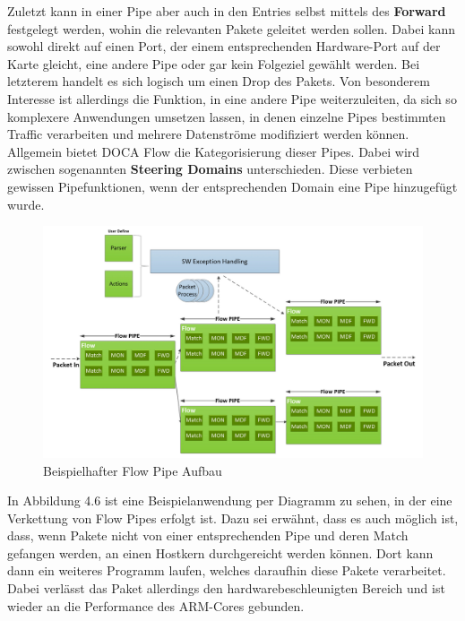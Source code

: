 Zuletzt kann in einer Pipe aber auch in den Entries selbst mittels des \textbf{Forward} festgelegt werden, wohin die relevanten Pakete geleitet werden sollen. Dabei kann sowohl direkt auf einen Port, der einem entsprechenden Hardware-Port auf der Karte gleicht, eine andere Pipe oder gar kein Folgeziel gewählt werden. Bei letzterem handelt es sich logisch um einen Drop des Pakets. Von besonderem Interesse ist allerdings die Funktion, in eine andere Pipe weiterzuleiten, da sich so komplexere Anwendungen umsetzen lassen, in denen einzelne Pipes bestimmten Traffic verarbeiten und mehrere Datenströme modifiziert werden können. Allgemein bietet DOCA Flow die Kategorisierung dieser Pipes. Dabei wird zwischen sogenannten \textbf{Steering Domains} unterschieden. Diese verbieten gewissen Pipefunktionen, wenn der entsprechenden Domain eine Pipe hinzugefügt wurde. 
\begin{figure}
    \centering
    \includegraphics[width=1\linewidth]{images/Screenshot 2025-04-30 at 11-16-05 DOCA Flow - NVIDIA Docs.png}
    \caption{Beispielhafter Flow Pipe Aufbau}
    \label{fig:enter-label}
\end{figure}

In Abbildung 4.6 ist eine Beispielanwendung per Diagramm zu sehen, in der eine Verkettung von Flow Pipes erfolgt ist. Dazu sei erwähnt, dass es auch möglich ist, dass, wenn Pakete nicht von einer entsprechenden Pipe und deren Match gefangen werden, an einen Hostkern durchgereicht werden können. Dort kann dann ein weiteres Programm laufen, welches daraufhin diese Pakete verarbeitet. Dabei verlässt das Paket allerdings den hardwarebeschleunigten Bereich und ist wieder an die Performance des ARM-Cores gebunden.
